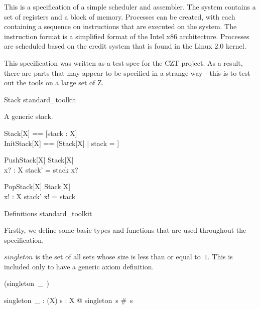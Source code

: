 \documentclass{article}
\begin{document}
This is a specification of a simple scheduler and assembler. The
system contains a set of registers and a block of memory. Processes
can be created, with each containing a sequence on instructions that
are executed on the system. The instruction format is a simplified
format of the Intel x86 architecture. Processes are scheduled based on
the credit system that is found in the Linux 2.0 kernel.

This specification was written as a test spec for the CZT project. As
a result, there are parts that may appear to be specified in a strange
way - this is to test out the tools on a large set of Z.

\begin{zsection}
  \SECTION Stack \parents standard\_toolkit
\end{zsection}

A generic stack.

\begin{zed}
  Stack[X] == [stack : \seq X]\\
  InitStack[X] == [Stack[X] | stack = \emptyset]
\end{zed}

\begin{schema}{PushStack}[X]
  \Delta Stack[X]\\
  x? : X
\where
  stack' = stack \cat \langle x? \rangle
\end{schema}

\begin{schema}{PopStack}[X]
  \Delta Stack[X]\\
  x! : X
\where
  stack' \cat \langle x! \rangle = stack
\end{schema}


\begin{zsection}
  \SECTION Definitions \parents standard\_toolkit
\end{zsection}

Firstly, we define some basic types and functions that are used
throughout the specification.

$singleton$ is the set of all sets whose size is less than or equal to~$1$.
This is included only to have a generic axiom definition.

\begin{zed}
  \relation (singleton~\_~)
\end{zed}

\begin{gendef}[X]
  singleton~\_ : \power (\power X)
\where
  \forall s : \power X @ singleton~s \iff \#~s 
\end{gendef}
\end{document}
